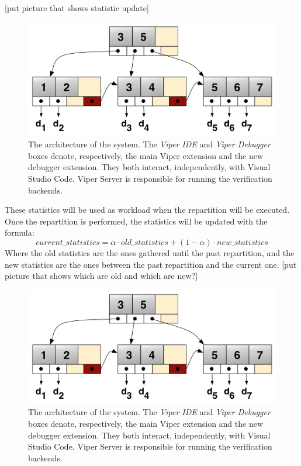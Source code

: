 [put picture that shows statistic update]
\begin{figure}[htb]
  \centering
  \includegraphics[width=\textwidth,height=\textheight,keepaspectratio]{img/b+tree.png}
  \caption[The architecture of the system]{ The architecture of the system. The
    \textit{Viper IDE} and \textit{Viper Debugger} boxes denote, respectively,
    the main Viper extension and the new debugger extension. They both interact,
    independently, with Visual Studio Code. Viper Server is responsible for
    running the verification backends.}
  \label{fig:b+tree}
\end{figure}

These statistics will be used as workload when the repartition will be executed. Once the repartition is performed, the statistics will be updated with the formula:
$$ current\_statistics = \alpha \cdot old\_statistics + (1-\alpha) \cdot new\_statistics $$
Where the old statistics are the ones gathered until the past repartition, and the new statistics are the ones between the past repartition and the current one.
[put picture that shows which are old and which are new?]
\begin{figure}[htb]
  \centering
  \includegraphics[width=\textwidth,height=\textheight,keepaspectratio]{img/b+tree.png}
  \caption[The architecture of the system]{ The architecture of the system. The
    \textit{Viper IDE} and \textit{Viper Debugger} boxes denote, respectively,
    the main Viper extension and the new debugger extension. They both interact,
    independently, with Visual Studio Code. Viper Server is responsible for
    running the verification backends.}
  \label{fig:b+tree}
\end{figure}

